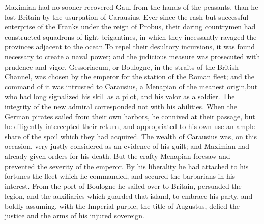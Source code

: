 Maximian had no sooner recovered Gaul from the hands of the
peasants, than he lost Britain by the usurpation of Carausius.
Ever since the rash but successful enterprise of the Franks under
the reign of Probus, their daring countrymen had constructed
squadrons of light brigantines, in which they incessantly ravaged
the provinces adjacent to the ocean.\footnotemark[24] To repel their desultory
incursions, it was found necessary to create a naval power; and
the judicious measure was prosecuted with prudence and vigor.
Gessoriacum, or Boulogne, in the straits of the British Channel,
was chosen by the emperor for the station of the Roman fleet; and
the command of it was intrusted to Carausius, a Menapian of the
meanest origin,\footnotemark[25] but who had long signalized his skill as a
pilot, and his valor as a soldier. The integrity of the new
admiral corresponded not with his abilities. When the German
pirates sailed from their own harbors, he connived at their
passage, but he diligently intercepted their return, and
appropriated to his own use an ample share of the spoil which
they had acquired. The wealth of Carausius was, on this occasion,
very justly considered as an evidence of his guilt; and Maximian
had already given orders for his death. But the crafty Menapian
foresaw and prevented the severity of the emperor. By his
liberality he had attached to his fortunes the fleet which he
commanded, and secured the barbarians in his interest. From the
port of Boulogne he sailed over to Britain, persuaded the legion,
and the auxiliaries which guarded that island, to embrace his
party, and boldly assuming, with the Imperial purple, the title
of Augustus, defied the justice and the arms of his injured
sovereign.\footnotemark[26]



